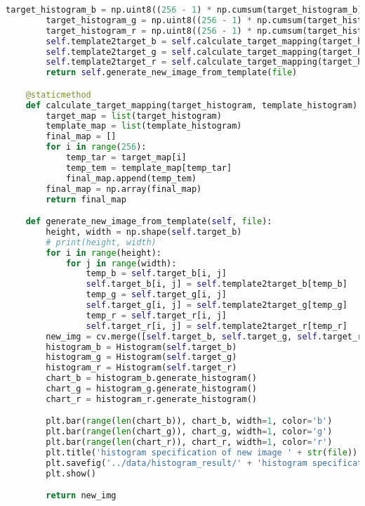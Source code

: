 \documentclass{hitreport}
\begin{document}
\begin{appendices}
\begin{lstlisting}[language=python]
        target_histogram_b = np.uint8((256 - 1) * np.cumsum(target_histogram_b) + 0.5)
        target_histogram_g = np.uint8((256 - 1) * np.cumsum(target_histogram_g) + 0.5)
        target_histogram_r = np.uint8((256 - 1) * np.cumsum(target_histogram_r) + 0.5)
        self.template2target_b = self.calculate_target_mapping(target_histogram_b, self.histogram_reverse_b)
        self.template2target_g = self.calculate_target_mapping(target_histogram_g, self.histogram_reverse_g)
        self.template2target_r = self.calculate_target_mapping(target_histogram_r, self.histogram_reverse_r)
        return self.generate_new_image_from_template(file)

    @staticmethod
    def calculate_target_mapping(target_histogram, template_histogram):
        target_map = list(target_histogram)
        template_map = list(template_histogram)
        final_map = []
        for i in range(256):
            temp_tar = target_map[i]
            temp_tem = template_map[temp_tar]
            final_map.append(temp_tem)
        final_map = np.array(final_map)
        return final_map

    def generate_new_image_from_template(self, file):
        height, width = np.shape(self.target_b)
        # print(height, width)
        for i in range(height):
            for j in range(width):
                temp_b = self.target_b[i, j]
                self.target_b[i, j] = self.template2target_b[temp_b]
                temp_g = self.target_g[i, j]
                self.target_g[i, j] = self.template2target_g[temp_g]
                temp_r = self.target_r[i, j]
                self.target_r[i, j] = self.template2target_r[temp_r]
        new_img = cv.merge([self.target_b, self.target_g, self.target_r])
        histogram_b = Histogram(self.target_b)
        histogram_g = Histogram(self.target_g)
        histogram_r = Histogram(self.target_r)
        chart_b = histogram_b.generate_histogram()
        chart_g = histogram_g.generate_histogram()
        chart_r = histogram_r.generate_histogram()

        plt.bar(range(len(chart_b)), chart_b, width=1, color='b')
        plt.bar(range(len(chart_g)), chart_g, width=1, color='g')
        plt.bar(range(len(chart_r)), chart_r, width=1, color='r')
        plt.title('histogram specification of new image ' + str(file))
        plt.savefig('../data/histogram_result/' + 'histogram specification of new image ' + str(file) + '.jpg')
        plt.show()

        return new_img


\end{lstlisting}
\end{appendices}
\end{document}
